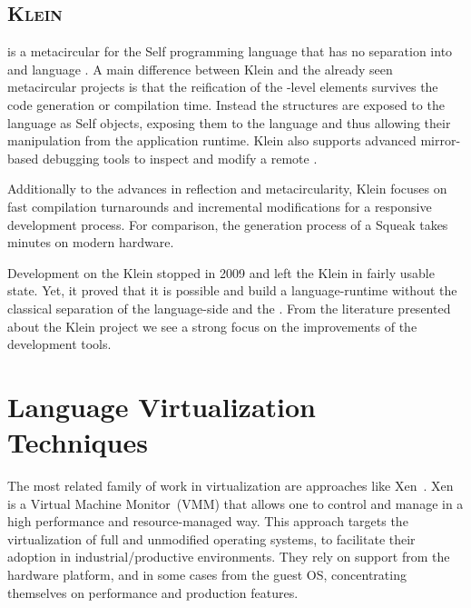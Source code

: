 \subsection*{\textsc{Klein \VM}}

 is a metacircular \VM for the Self programming language that has no separation into \VM and language \cite{Unga05a}.
A main difference between Klein and the already seen metacircular \VM projects is that the reification of the \VM-level elements survives the code generation or compilation time.
Instead the \VM structures are exposed to the language as Self objects, exposing them to the language and thus allowing their manipulation from the application runtime.
Klein also supports advanced mirror-based debugging tools to inspect and modify a remote \VM.

Additionally to the advances in reflection and metacircularity, Klein focuses on fast compilation turnarounds and incremental modifications for a responsive development process.
For comparison, the generation process of a Squeak \VM takes minutes on modern hardware.

Development on the Klein \VM stopped in 2009 and left the Klein \VM in fairly usable state.
Yet, it proved that it is possible and build a language-runtime without the classical separation of the language-side and the \VM.
From the literature presented about the Klein project we see a strong focus on the improvements of the development tools.

\section{Language Virtualization Techniques}\label{sec:background_virtualization_techniques}

The most related family of work in virtualization are approaches like Xen~\cite{Chis07a}. Xen is a Virtual Machine Monitor~(VMM) that allows one to control and manage \VMs in a high performance and resource-managed way. This approach targets the virtualization of full and unmodified operating systems, to facilitate their adoption in industrial/productive environments. They rely on support from the hardware platform, and in some cases from the guest OS, concentrating themselves on performance and production features.

